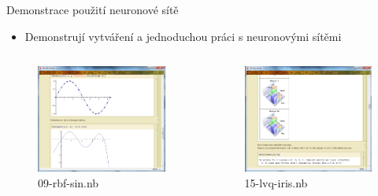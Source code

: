 \documentclass{beamer}
\begin{document}
\begin{frame}{Demonstrace použití neuronové sítě}
\begin{itemize}
\item Demonstrují vytváření a jednoduchou práci s neuronovými sítěmi
\end{itemize} 
  \begin{columns}[T]
    \column{5cm}
      \begin{figure}
   \includegraphics[width=5.5cm]{uk3.png}
   \caption{09-rbf-sin.nb}
\end{figure}
    \column{5cm}
      \begin{figure}
   \includegraphics[width=5.5cm]{uk4.png}
   \caption{15-lvq-iris.nb}
\end{figure}
  \end{columns}
\end{frame}
\end{document}
